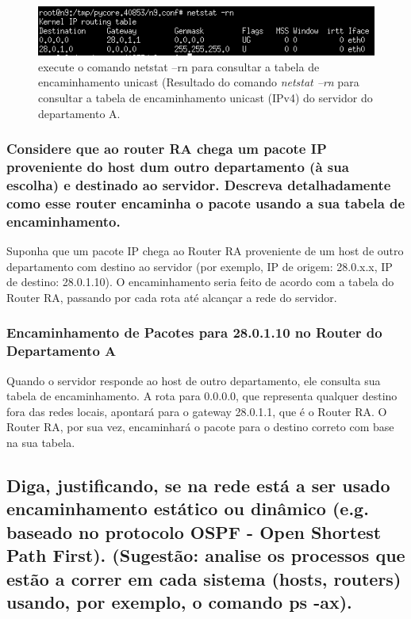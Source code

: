 \documentclass{article}
\begin{document}
\begin{figure} [h]
    \centering
    \includegraphics[width=0.75\linewidth]{images/servera.png}
    \caption{execute o comando netstat –rn
para consultar a tabela de encaminhamento unicast (Resultado do comando \textit{netstat –rn}
para consultar a tabela de encaminhamento unicast (IPv4) do servidor do departamento A.}
    \label{fig:enter-label}
\end{figure}

\subsubsection{Considere que ao router RA chega um pacote IP proveniente do host dum outro departamento (à sua escolha) e destinado ao servidor. Descreva detalhadamente como esse router encaminha o pacote usando a sua tabela de encaminhamento.}

Suponha que um pacote IP chega ao Router RA proveniente de um host de outro departamento com destino ao servidor (por exemplo, IP de origem: 28.0.x.x, IP de destino: 28.0.1.10). O encaminhamento seria feito de acordo com a tabela do Router RA, passando por cada rota até alcançar a rede do servidor.

\subsubsection{Encaminhamento de Pacotes para 28.0.1.10 no Router do Departamento A}

Quando o servidor responde ao host de outro departamento, ele consulta sua tabela de encaminhamento. A rota para 0.0.0.0, que representa qualquer destino fora das redes locais, apontará para o gateway 28.0.1.1, que é o Router RA. O Router RA, por sua vez, encaminhará o pacote para o destino correto com base na sua tabela.


\subsection{Diga, justificando, se na rede está a ser usado encaminhamento estático ou
dinâmico (e.g. baseado no protocolo OSPF - Open Shortest Path First). (Sugestão:
analise os processos que estão a correr em cada sistema (hosts, routers) usando,
por exemplo, o comando ps -ax).}
\end{document}
